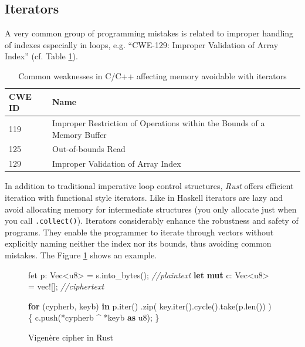 \documentclass[final,5p,times,twocolumn]{elsarticle}
\newenvironment{Shaded}{}{}
\newcommand{\KeywordTok}[1]{\textcolor[rgb]{0.00,0.44,0.13}{\textbf{{#1}}}}
\newcommand{\DataTypeTok}[1]{\textcolor[rgb]{0.56,0.13,0.00}{{#1}}}
\newcommand{\CommentTok}[1]{\textcolor[rgb]{0.38,0.63,0.69}{\textit{{#1}}}}
\newcommand{\PreprocessorTok}[1]{\textcolor[rgb]{0.74,0.48,0.00}{{#1}}}
\newcommand{\NormalTok}[1]{{#1}}
\begin{document}
\subsection{Iterators}\label{_iterators}

A very common group of programming mistakes is related to improper handling of
indexes especially in loops, e.g. ``CWE-129: Improper Validation of Array
Index'' (cf. Table
\ref{tab:c-memory-safety-bugs2}\cite{mitrecorporation2016}).

\begin{table}[htbp]
\begin{center}
\begin{tabular}{ | l  p{6.5cm} | }
\hline
CWE ID & Name \\
\hline
\hline
119 & Improper Restriction of Operations within the Bounds of a Memory Buffer \\
125 & Out-of-bounds Read \\
129 & Improper Validation of Array Index \\
\hline
\end{tabular}
\end{center}
    \caption{Common weaknesses in C/C++ affecting memory avoidable with 
	     iterators\protect\cite{mitrecorporation2016}}
    \label{tab:c-memory-safety-bugs2}
\end{table}


In addition to traditional imperative loop control structures, \emph{Rust}
offers efficient iteration with functional style iterators.  Like in Haskell
iterators are lazy and avoid allocating memory for intermediate structures (you
only allocate just when you call \texttt{.collect()}). Iterators considerably
enhance the robustness and safety of programs. They enable the programmer to
iterate through vectors without explicitly naming neither the index nor its
bounds, thus avoiding common mistakes. The Figure \ref{fig:cipher} shows
an example.


\begin{figure}[htbp]
\begin{Shaded}
\begin{Highlighting}[]
\NormalTok{fet p: }\DataTypeTok{Vec}\NormalTok{<}\DataTypeTok{u8}\NormalTok{> = s.into_bytes(); }\CommentTok{//plaintext}
\KeywordTok{let} \KeywordTok{mut} \NormalTok{c: }\DataTypeTok{Vec}\NormalTok{<}\DataTypeTok{u8}\NormalTok{> = }\PreprocessorTok{vec!}\NormalTok{[];     }\CommentTok{//ciphertext}

\KeywordTok{for} \NormalTok{(cypherb, keyb) }\KeywordTok{in} \NormalTok{p.iter()}
    \NormalTok{.zip(  key.iter().cycle().take(p.len())  ) \{}
        \NormalTok{c.push(*cypherb ^ *keyb }\KeywordTok{as} \DataTypeTok{u8}\NormalTok{);}
    \NormalTok{\}}
\end{Highlighting}
\end{Shaded}
\caption{Vigenère cipher in Rust}
\label{fig:cipher}
\end{figure}
\end{document}
